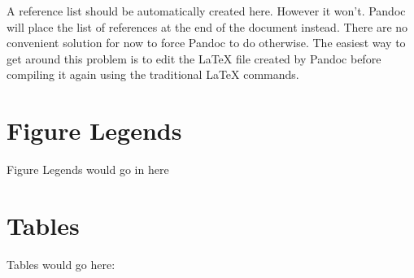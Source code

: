\documentclass[10pt]{article}
\begin{document}
A reference list should be automatically created here. However it won't.
Pandoc will place the list of references at the end of the document
instead. There are no convenient solution for now to force Pandoc to do
otherwise. The easiest way to get around this problem is to edit the
LaTeX file created by Pandoc before compiling it again using the
traditional LaTeX commands.

\section*{Figure Legends}\label{figure-legends}

Figure Legends would go in here

\section*{Tables}\label{tables}

Tables would go here:
\end{document}
